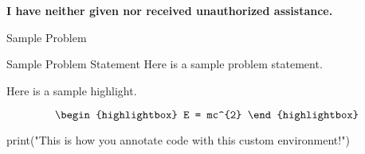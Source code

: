 \clearpage
\chapter{\documentNumber}

\section{\documentName}


\begin{center}
    \Large{\textbf{I have neither given nor received unauthorized assistance.}}
    \large{\textbf{\authorName}}
\end{center}

\begin{problem}{Sample Problem}
    \begin{statement}{Sample Problem Statement}
        Here is a sample problem statement.
    \end{statement}

    \begin{highlight}
        Here is a sample highlight.

        \begin{equation*}
            \begin{highlightbox}
                E = mc^{2}
            \end{highlightbox}
        \end{equation*}
    \begin{code}[Python]
    print("This is how you annotate code with this custom environment!")
    \end{code}
    \end{highlight}
\end{problem}